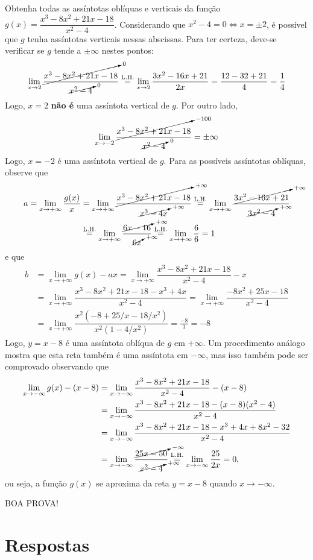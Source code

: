 \documentclass[12pt,a4paper]{article}
\begin{document}
\begin{ExerciseList}
\Exercise[title={2,0}]
Obtenha todas as assíntotas oblíquas e verticais da função $g(x) = \dfrac{x^3 - 8x^2 + 21x - 18}{x^2 - 4}$.
\Answer Considerando que $x^2 - 4 = 0 \Leftrightarrow x = \pm 2$, é possível que $g$ tenha assíntotas verticais nessas abscissas. Para ter certeza, deve-se verificar se $g$ tende a $\pm \infty$ nestes pontos:
\[
  \lim_{x \to 2} \dfrac{\cancelto{0}{x^3 - 8x^2 + 21x - 18}}{\cancelto{0}{x^2 - 4}}
\stackrel{\text{L.H.}}{=}
  \lim_{x \to 2} \dfrac{3x^2 - 16x + 21}{2x}
= \dfrac{12 - 32 + 21}{4}
= \dfrac{1}{4}
\]
Logo, $x = 2$ \textbf{não é} uma assíntota vertical de $g$. Por outro lado,
\[
  \lim_{x \to -2} \dfrac{ \cancelto{-100}{x^3 - 8x^2 + 21x - 18} }{ \cancelto{0}{x^2 - 4}}
= \pm \infty
\]
Logo, $x=-2$ é uma assíntota vertical de $g$. Para as possíveis assíntotas oblíquas, observe que
\begin{align*}
  a = \lim_{x \to +\infty} \frac{g(x)}{x}
& = \lim_{x \to +\infty} \dfrac{ \cancelto{+\infty}{x^3 - 8x^2 + 21x - 18} }{ \cancelto{+\infty}{x^3 - 4x}}
\stackrel{\text{L.H.}}{=}
\lim_{x \to +\infty} \dfrac{ \cancelto{+\infty}{3x^2 - 16x + 21} }{ \cancelto{+\infty}{3x^2 - 4}} \\
& \stackrel{\text{L.H.}}{=}
\lim_{x \to +\infty} \dfrac{ \cancelto{+\infty}{6x - 16} }{ \cancelto{+\infty}{6x}}
\stackrel{\text{L.H.}}{=}
\lim_{x \to +\infty} \dfrac{ 6 }{ 6 }
= 1
\end{align*}
e que
\begin{align*}
b
& = \lim_{x \to +\infty} g(x) - a x
  = \lim_{x \to +\infty} \dfrac{ x^3 - 8x^2 + 21x - 18 }{ x^2 - 4 } - x \\
& = \lim_{x \to +\infty} \dfrac{ x^3 - 8x^2 + 21x - 18 - x^3 + 4x}{ x^2 - 4 }
  = \lim_{x \to +\infty} \dfrac{ -8x^2 + 25x - 18}{ x^2 - 4 } \\
& = \lim_{x \to +\infty} \dfrac{x^2 (-8 + 25/x - 18/x^2)}{ x^2(1 - 4/x^2) }
  = \frac{-8}{1} = -8
\end{align*}
Logo, $y = x-8$ é uma assíntota oblíqua de $g$ em $+\infty$. Um procedimento análogo mostra que esta reta também é uma assíntota em $-\infty$, mas isso também pode ser comprovado observando que
\begin{align*}
    \lim_{x \to -\infty} g(x) - (x - 8)
& = \lim_{x \to -\infty} \dfrac{ x^3 - 8x^2 + 21x - 18 }{ x^2 - 4 } - (x-8) \\
& = \lim_{x \to -\infty} \dfrac{ x^3 - 8x^2 + 21x - 18 - (x-8)(x^2 -4)}{ x^2 - 4 } \\
& = \lim_{x \to -\infty} \dfrac{ x^3 - 8x^2 + 21x - 18 - x^3+4x+8x^2-32}{ x^2 - 4 } \\
& = \lim_{x \to -\infty} \dfrac{ \cancelto{-\infty}{25x - 50} }{ \cancelto{+\infty}{x^2 - 4} }
 \stackrel{\text{L.H.}}{=}
 \lim_{x \to -\infty} \dfrac{ 25 }{ 2x } = 0,
\end{align*}
ou seja, a função $g(x)$ se aproxima da reta $y = x-8$ quando $x \to -\infty$.
\end{ExerciseList}

\begin{center}
BOA PROVA!
\end{center}

\newpage
\restoregeometry
\section*{Respostas}
\shipoutAnswer
\end{document}
